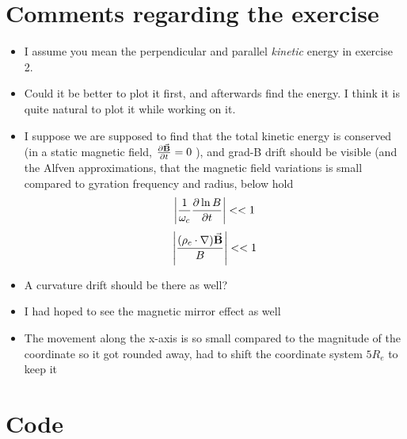 \documentclass[x11names]{article}
\begin{document}
\section{Comments regarding the exercise}
      \begin{itemize}
            \item I assume you mean the perpendicular and parallel \textit{kinetic} energy in exercise 2.
            \item Could it be better to plot it first, and afterwards find the energy. I think it is quite natural to plot it while working on it.
            \item I suppose we are supposed to find that the total kinetic energy is conserved (in a static magnetic field, \(\pdv{\va{B}}{t} = 0\) ), and grad-B drift should be visible (and the Alfven approximations, that the magnetic field variations is small compared to gyration frequency and radius, below hold
            \[ \left|\frac{1}{\omega_c} \pdv{\ln{B}}{t}\right| << 1 \] 
            \[ \left| \frac{(\rho_c \cdot \nabla)\va{B}}{B} \right| << 1 \] 
            \item A curvature drift should be there as well?
            \item I had hoped to see the magnetic mirror effect as well
            \item The movement along the x-axis is so small compared to the magnitude of the coordinate so it got rounded away, had to shift the coordinate system \(5R_e\) to keep it
      \end{itemize}


\section{Code}
      
\end{document}
